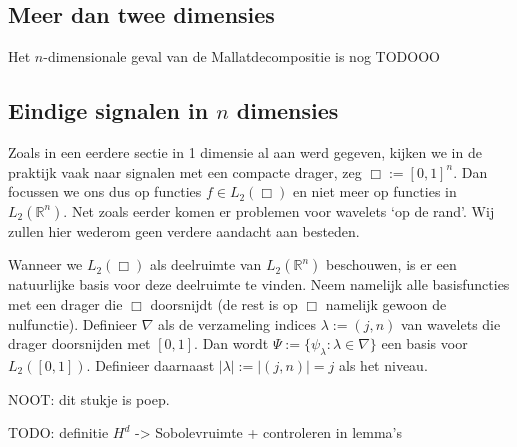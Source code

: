 \documentclass[11pt]{report}
\newcommand{\R}{\mathbb{R}}
\theoremstyle{plain}
\theoremstyle{remark}
\begin{document}
\subsection{Meer dan twee dimensies}
Het $n$-dimensionale geval van de Mallatdecompositie is nog TODOOO

\subsection{Eindige signalen in $n$ dimensies}
Zoals in een eerdere sectie in 1 dimensie al aan werd gegeven, kijken we in de praktijk vaak naar signalen met een compacte drager, zeg $\Box := [0,1]^n$. Dan focussen we ons dus op functies $f \in L_2(\Box)$ en niet meer op functies in $L_2(\R^n)$. Net zoals eerder komen er problemen voor wavelets `op de rand'. Wij zullen hier wederom geen verdere aandacht aan besteden.

Wanneer we $L_2(\Box)$ als deelruimte van $L_2(\R^n)$ beschouwen, is er een natuurlijke basis voor deze deelruimte te vinden. Neem namelijk alle basisfuncties met een drager die $\Box$ doorsnijdt (de rest is op $\Box$ namelijk gewoon de nulfunctie). Definieer $\nabla$ als de verzameling indices $\lambda := (j, n)$ van wavelets die drager doorsnijden met $[0,1]$. Dan wordt $\Psi := \{ \psi_\lambda: \lambda \in \nabla \}$ een basis voor $L_2([0,1])$. Definieer daarnaast $|\lambda| := |(j,n)| = j$ als het niveau.

NOOT: dit stukje is poep.

TODO: definitie $H^d$ -> Sobolevruimte + controleren in lemma's
\end{document}
